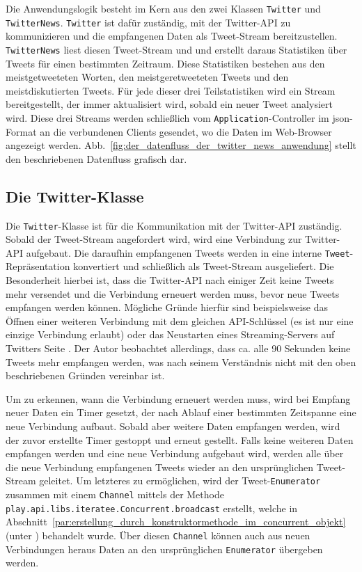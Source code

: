 Die Anwendungslogik besteht im Kern aus den zwei Klassen \lstinline|Twitter| und \lstinline|TwitterNews|.
\lstinline|Twitter| ist dafür zuständig, mit der Twitter-API zu kommunizieren und die empfangenen Daten als Tweet-Stream bereitzustellen.
\lstinline|TwitterNews| liest diesen Tweet-Stream und und erstellt daraus Statistiken über Tweets für einen bestimmten Zeitraum.
Diese Statistiken bestehen aus den meistgetweeteten Worten, den meistgeretweeteten Tweets und den meistdiskutierten Tweets.
Für jede dieser drei Teilstatistiken wird ein Stream bereitgestellt, der immer aktualisiert wird, sobald ein neuer Tweet analysiert wird.
Diese drei Streams werden schließlich vom \lstinline|Application|-Controller im \gls{json}-Format an die verbundenen Clients gesendet, wo die Daten im Web-Browser angezeigt werden.
Abb.~\ref{fig:der_datenfluss_der_twitter_news_anwendung} stellt den beschriebenen Datenfluss grafisch dar.


\subsection{Die Twitter-Klasse} %
\label{sub:die_twitter_klasse}

Die \lstinline|Twitter|-Klasse ist für die Kommunikation mit der Twitter-API zuständig.
Sobald der Tweet-Stream angefordert wird, wird eine Verbindung zur Twitter-API aufgebaut.
Die daraufhin empfangenen Tweets werden in eine interne \lstinline|Tweet|-Repräsentation konvertiert und schließlich als Tweet-Stream ausgeliefert.
Die Besonderheit hierbei ist, dass die Twitter-API nach einiger Zeit keine Tweets mehr versendet und die Verbindung erneuert werden muss, bevor neue Tweets empfangen werden können.
Mögliche Gründe hierfür sind beispielsweise das Öffnen einer weiteren Verbindung mit dem gleichen API-Schlüssel (es ist nur eine einzige Verbindung erlaubt) oder das Neustarten eines Streaming-Servers auf Twitters Seite \cite[vgl.][]{twitter_connecting_to_streaming_endpoint}.
Der Autor beobachtet allerdings, dass ca. alle 90 Sekunden keine Tweets mehr empfangen werden, was nach seinem Verständnis nicht mit den oben beschriebenen Gründen vereinbar ist.

Um zu erkennen, wann die Verbindung erneuert werden muss, wird bei Empfang neuer Daten ein Timer gesetzt, der nach Ablauf einer bestimmten Zeitspanne eine neue Verbindung aufbaut.
Sobald aber weitere Daten empfangen werden, wird der zuvor erstellte Timer gestoppt und erneut gestellt.
Falls keine weiteren Daten empfangen werden und eine neue Verbindung aufgebaut wird, werden alle über die neue Verbindung empfangenen Tweets wieder an den ursprünglichen Tweet-Stream geleitet.
Um letzteres zu ermöglichen, wird der Tweet-\lstinline|Enumerator| zusammen mit einem \lstinline|Channel| mittels der Methode \lstinline|play.api.libs.iteratee.Concurrent.broadcast| erstellt, welche in Abschnitt~\ref{par:erstellung_durch_konstruktormethode_im_concurrent_objekt} (unter ) behandelt wurde.
Über diesen \lstinline|Channel| können auch aus neuen Verbindungen heraus Daten an den ursprünglichen \lstinline|Enumerator| übergeben werden.



